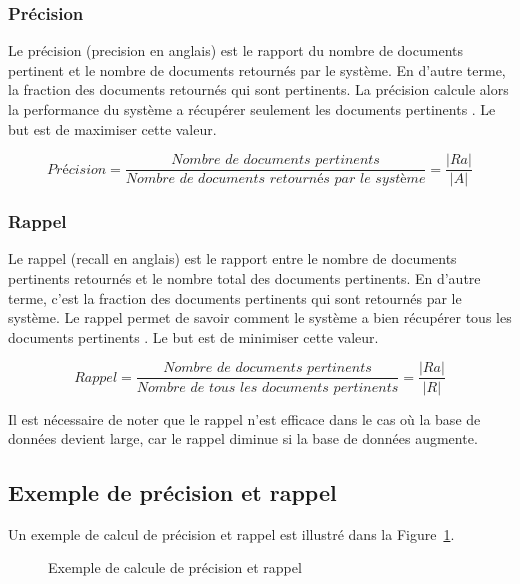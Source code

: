 \subsubsection{Précision}
Le précision (precision en anglais) est le rapport du nombre de documents pertinent et le nombre de documents retournés par le système. En d'autre terme, la fraction des documents retournés qui sont pertinents. La précision calcule alors la performance du système a récupérer seulement les documents pertinents \citep*{ir-on-web, evaluation-of-ir-system, vsm-for-arabic-language}. Le but est de maximiser cette valeur.

\[
	Précision = \frac{\textit{Nombre de documents pertinents}}{\textit{Nombre de documents retournés par le système}} = \frac{|Ra|}{|A|}
\]

\subsubsection{Rappel}
Le rappel (recall en anglais) est le rapport entre le nombre de documents pertinents retournés et le nombre total des documents pertinents. En d'autre terme, c'est la fraction des documents pertinents qui sont retournés par le système. Le rappel permet de savoir comment le système a bien récupérer tous les documents pertinents \citep*{ir-on-web, evaluation-of-ir-system, vsm-for-arabic-language}. Le but est de minimiser cette valeur.

\[
	Rappel = \frac{\textit{Nombre de documents pertinents}}{\textit{Nombre de tous les documents pertinents}} = \frac{|Ra|}{|R|}
\]

Il est nécessaire de noter que le rappel n'est efficace dans le cas où la base de données devient large, car le rappel diminue si la base de données augmente. 

\subsection{Exemple de précision et rappel}
Un exemple de calcul de précision et rappel est illustré dans la Figure~\ref{fig:example-prec-rec}.
\begin{figure}[htbp]
	\begin{center}
	\end{center}
	\caption{Exemple de calcule de précision et rappel \citep{evaluation-sri-cours}}\label{fig:example-prec-rec}
\end{figure}

